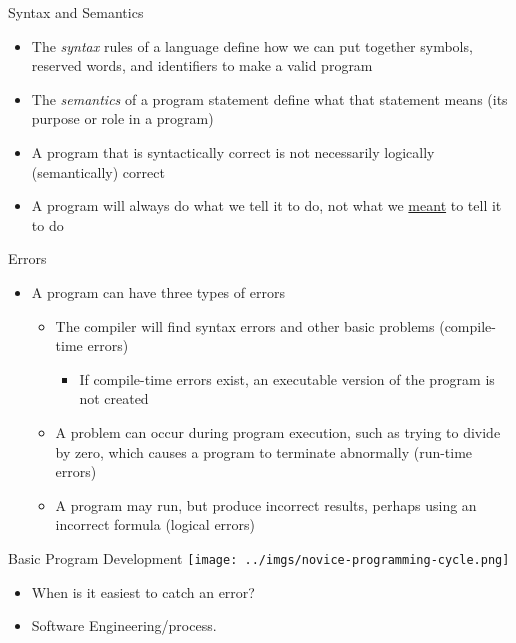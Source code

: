 \documentclass{beamer}
\begin{document}
\begin{frame}{Syntax and Semantics}
\begin{itemize}
\item The \textit{syntax} rules of a language define how we can put together symbols, reserved words, and identifiers to make a valid program
\item The \textit{semantics} of a program statement define what that statement means (its purpose or role in a program)
\item A program that is syntactically correct is not necessarily logically (semantically) correct
\item A program will always do what we tell it to do, not what we \underline{meant} to tell it to do
\end{itemize}
\end{frame}

\begin{frame}{Errors}
\begin{itemize}
\item A program can have three types of errors
\begin{itemize}
\item The compiler will find syntax errors and other basic problems (compile-time errors)
\begin{itemize}
\item If compile-time errors exist, an executable version of the program is not created
\end{itemize}
\item A problem can occur during program execution, such as trying to divide by zero, which causes a program to terminate abnormally (run-time errors)
\item A program may run, but produce incorrect results, perhaps using an incorrect formula (logical errors) 
\end{itemize}
\end{itemize}
\end{frame}

\begin{frame}{Basic Program Development}
\texttt{[image: ../imgs/novice-programming-cycle.png]}
\begin{itemize}
\item When is it easiest to catch an error?
\item Software Engineering/process.
\end{itemize}
\end{frame}
\end{document}
